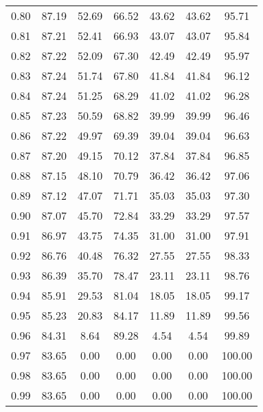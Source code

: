 \begin{tabular}{|c|c|c|c|c|c|c|}
      0.80 &     87.19 &     52.69 &      66.52 &   43.62 &      43.62 &         95.71 \\
      0.81 &     87.21 &     52.41 &      66.93 &   43.07 &      43.07 &         95.84 \\
      0.82 &     87.22 &     52.09 &      67.30 &   42.49 &      42.49 &         95.97 \\
      0.83 &     87.24 &     51.74 &      67.80 &   41.84 &      41.84 &         96.12 \\
      0.84 &     87.24 &     51.25 &      68.29 &   41.02 &      41.02 &         96.28 \\
      0.85 &     87.23 &     50.59 &      68.82 &   39.99 &      39.99 &         96.46 \\
      0.86 &     87.22 &     49.97 &      69.39 &   39.04 &      39.04 &         96.63 \\
      0.87 &     87.20 &     49.15 &      70.12 &   37.84 &      37.84 &         96.85 \\
      0.88 &     87.15 &     48.10 &      70.79 &   36.42 &      36.42 &         97.06 \\
      0.89 &     87.12 &     47.07 &      71.71 &   35.03 &      35.03 &         97.30 \\
      0.90 &     87.07 &     45.70 &      72.84 &   33.29 &      33.29 &         97.57 \\
      0.91 &     86.97 &     43.75 &      74.35 &   31.00 &      31.00 &         97.91 \\
      0.92 &     86.76 &     40.48 &      76.32 &   27.55 &      27.55 &         98.33 \\
      0.93 &     86.39 &     35.70 &      78.47 &   23.11 &      23.11 &         98.76 \\
      0.94 &     85.91 &     29.53 &      81.04 &   18.05 &      18.05 &         99.17 \\
      0.95 &     85.23 &     20.83 &      84.17 &   11.89 &      11.89 &         99.56 \\
      0.96 &     84.31 &      8.64 &      89.28 &    4.54 &       4.54 &         99.89 \\
      0.97 &     83.65 &      0.00 &       0.00 &    0.00 &       0.00 &        100.00 \\
      0.98 &     83.65 &      0.00 &       0.00 &    0.00 &       0.00 &        100.00 \\
      0.99 &     83.65 &      0.00 &       0.00 &    0.00 &       0.00 &        100.00 \\
\bottomrule
\end{tabular}
